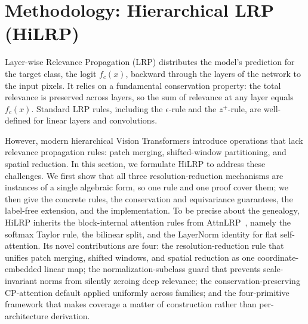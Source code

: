 \documentclass[lettersize,journal]{IEEEtran}
\begin{document}
\section{Methodology: Hierarchical LRP (HiLRP)}
\label{sec:methodology}

Layer-wise Relevance Propagation (LRP) distributes the model's prediction for the target class, the logit $f_c(x)$, backward through the layers of the network to the input pixels. It relies on a fundamental conservation property: the total relevance is preserved across layers, so the sum of relevance at any layer equals $f_c(x)$. Standard LRP rules, including the $\epsilon$-rule and the $z^+$-rule, are well-defined for linear layers and convolutions.

However, modern hierarchical Vision Transformers introduce operations that lack relevance propagation rules: patch merging, shifted-window partitioning, and spatial reduction. In this section, we formulate HiLRP to address these challenges. We first show that all three resolution-reduction mechanisms are instances of a single algebraic form, so one rule and one proof cover them; we then give the concrete rules, the conservation and equivariance guarantees, the label-free extension, and the implementation. To be precise about the genealogy, HiLRP inherits the block-internal attention rules from AttnLRP~\cite{achtibat2024attnlrp}, namely the softmax Taylor rule, the bilinear split, and the LayerNorm identity for flat self-attention. Its novel contributions are four: the resolution-reduction rule that unifies patch merging, shifted windows, and spatial reduction as one coordinate-embedded linear map; the normalization-subclass guard that prevents scale-invariant norms from silently zeroing deep relevance; the conservation-preserving CP-attention default applied uniformly across families; and the four-primitive framework that makes coverage a matter of construction rather than per-architecture derivation.
\end{document}
